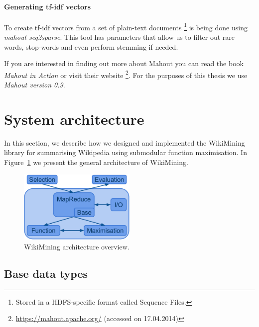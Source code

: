 \paragraph{Generating tf-idf vectors} To create tf-idf vectors from a set of
plain-text documents \footnote{Stored in a \ac{HDFS}-specific format called
Sequence Files.} is being done using \emph{mahout seq2sparse}. This tool has
parameters that allow us to filter out rare words, stop-words and even perform
stemming if needed.

If you are interested in finding out more about Mahout you can read the book
\emph{Mahout in Action} \cite{owen2011mahout} or visit their website
\footnote{\url{https://mahout.apache.org/} (accessed on 17.04.2014)}. For the
purposes of this thesis we use \emph{Mahout version 0.9}.

\section{System architecture}
\label{sec:arch}

In this section, we describe how we designed and implemented the WikiMining
library for summarising Wikipedia using submodular function maximisation.
In Figure~\ref{fig:wikimining} we present the general architecture of
WikiMining.

\begin{figure}
  \centering
  \includegraphics[width=0.5\textwidth,natwidth=1156,natheight=718]{images/wikimining.png}
  \caption{WikiMining architecture overview.}
  \label{fig:wikimining}
\end{figure}

\subsection{Base data types}

